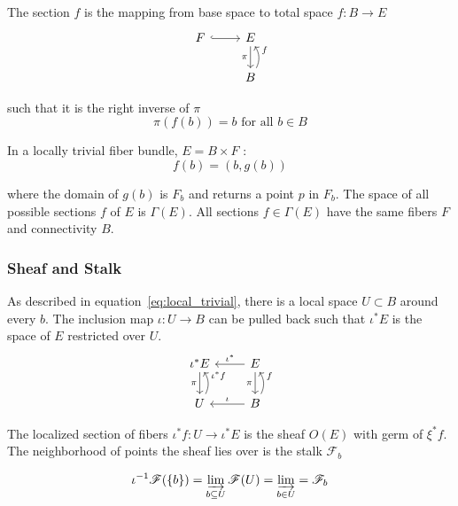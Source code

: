 \documentclass[../main.tex]{subfiles}
\begin{document}
The section $f$ is the mapping from base space to total space $f: B\rightarrow E$ 
\begin{equation}
    \begin{tikzcd}
        F \arrow[r, hook] & E \arrow[d, "\pi"']           \\
        & B \arrow[u, "f"', bend right]
    \end{tikzcd}
\end{equation}

such that it is the right inverse of $\pi$
\begin{equation}
    \pi(f(b)) = b \text{ for all } b \in B 
\end{equation}

In a locally trivial fiber bundle, $E = B \times F$ \cite{rowlandFiberBundle,FiberBundle2020}:
\begin{equation}
f(b) = (b, g(b))
\end{equation}

where the domain of $g(b)$ is $F_b$ and returns a point $p$ in $F_b$. The space of all possible sections $f$ of $E$ is $\Gamma(E)$. All sections $f \in \Gamma(E)$ have the same fibers $F$ and connectivity $B$. 

\subsubsection{Sheaf and Stalk}
As described in equation~\ref{eq:local_trivial}, there is a local space $U \subset B$ around every $b$. The inclusion map $\iota: U \rightarrow B$ can be pulled back such that $\iota^{*}E$ is the space of $E$ restricted over $U$. 
\begin{equation}
    \begin{tikzcd}
        \iota^*E \arrow[d, "\pi"']           & E \arrow[d, "\pi"'] \arrow[l, "\iota^*"']         \\
        U \arrow[u, "\iota^*f"', bend right] & B \arrow[u, "f"', bend right] \arrow[l, "\iota"']
        \end{tikzcd}
\end{equation}

The localized section of fibers $\iota^*f: U \rightarrow \iota^*E$ is the sheaf $O(E)$ with germ of $\xi^*f$. The neighborhood of points the sheaf lies over is the stalk $\mathscr{F}_b$ \cite{StalkSheaf2019,spanier1989algebraic}

\begin{equation}
    \iota^{-1}\mathscr{F}(\{b\}) = \varinjlim_{b\subseteq U}\mathscr{F}(U) =  \varinjlim_{b \in U} = \mathscr{F}_b 
\end{equation}
\end{document}

